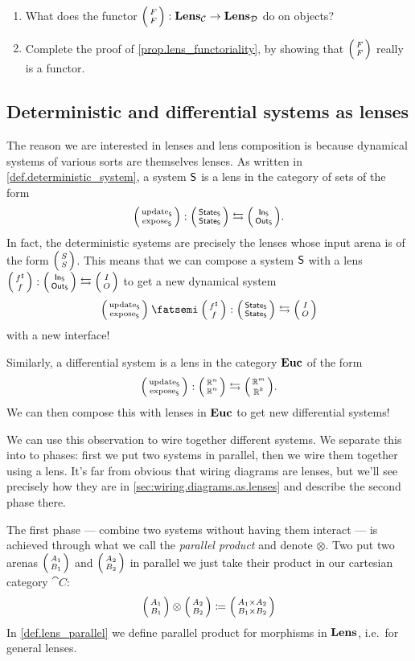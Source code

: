 \documentclass[DynamicalBook]{subfiles}
\begin{document}
\begin{exercise}
 \begin{enumerate}
 	\item What does the functor $\lens FF: \Cat{Lens}_{\cat{C}} \to \Cat{Lens}_{\cat{D}}$ do on objects?
	\item Complete the proof of \cref{prop.lens_functoriality}, by showing that $\lens FF$ really is a functor.
	\qedhere
\end{enumerate}
\end{exercise}

\subsection{Deterministic and differential systems as lenses}

The reason we are interested in lenses and lens composition is because
dynamical systems of various sorts are themselves lenses. As written in
\cref{def.deterministic_system}, a system $\mathsf{S}$ is a lens in the category of
sets of the form
$$\lens{\update{S}}{\expose{S}} : \lens{\State{S}}{\State{S}} \leftrightarrows \lens{\In{S}}{\Out{S}}.$$
In fact, the deterministic systems are precisely the lenses whose input arena is of the form $\lens SS$. This means that we can compose
a system $\mathsf{S}$ with a lens $\lens{f^{\sharp}}{f} : \lens{\In{S}}{\Out{S}}
\leftrightarrows \lens{I}{O}$ to get a new dynamical system
$$  \lens{\update{S}}{\expose{S}} \then \lens{f^{\sharp}}{f} :
\lens{\State{S}}{\State{S}} \leftrightarrows \lens{I}{O}$$
with a new interface!

Similarly, a differential system is a lens in the category $\textbf{Euc}$ of the form
\[
\lens{\update{S}}{\expose{S}} : \lens{\rr^n}{\rr^n} \fromto \lens{\rr^m}{\rr^k}.
\]
We can then compose this with lenses in $\textbf{Euc}$ to get new differential systems!

We can use this observation to wire together different systems. We separate this into to phases: first we put two systems in parallel, then we wire them together using a lens. It's far from obvious that wiring diagrams are lenses, but we'll see precisely how they are in \cref{sec:wiring.diagrams.as.lenses} and describe the second phase there.

The first phase --- combine two systems without having them interact --- is achieved through what we call the \emph{parallel product} and denote $\otimes$. Two put two arenas $\lens{A_1}{B_1}$ and $\lens{A_2}{B_2}$ in parallel we just take their product in our cartesian category $\cat{C}$:
\[
\lens{A_1}{B_1}\otimes\lens{A_2}{B_2}\coloneqq\lens{A_1\times A_2}{B_1\times B_2}
\]
In \cref{def.lens_parallel} we define parallel product for morphisms in $\textbf{Lens}$, i.e.\ for general lenses.
\end{document}
